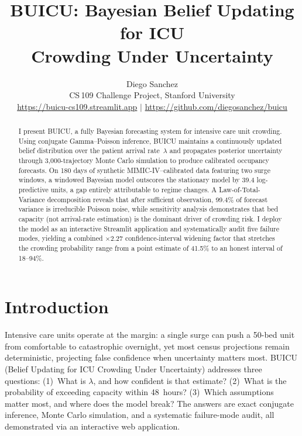 \documentclass[10pt, twocolumn]{article}
\title{\vspace{-1.5em}\textbf{BUICU: Bayesian Belief Updating for ICU\\Crowding Under Uncertainty}\vspace{-0.5em}}
\author{Diego Sanchez\\
\small CS\,109 Challenge Project, Stanford University\\[-2pt]
\small \url{https://buicu-cs109.streamlit.app} \;\;$\mid$\;\;
\url{https://github.com/diegosanchez/buicu}}
\date{}
\begin{document}
\maketitle
\thispagestyle{empty}

\begin{abstract}
\noindent I present BUICU, a fully Bayesian forecasting system for
intensive care unit crowding. Using conjugate Gamma--Poisson inference,
BUICU maintains a continuously updated belief distribution over the
patient arrival rate~$\lambda$ and propagates posterior uncertainty
through 3,000-trajectory Monte Carlo simulation to produce calibrated
occupancy forecasts. On 180 days of synthetic MIMIC-IV--calibrated data
featuring two surge windows, a windowed Bayesian model outscores the
stationary model by 39.4 log-predictive units, a gap entirely
attributable to regime changes. A Law-of-Total-Variance decomposition
reveals that after sufficient observation, 99.4\% of forecast variance
is irreducible Poisson noise, while sensitivity analysis demonstrates
that bed capacity (not arrival-rate estimation) is the dominant driver
of crowding risk. I deploy the model as an interactive Streamlit
application and systematically audit five failure modes, yielding a
combined $\times 2.27$ confidence-interval widening factor that
stretches the crowding probability range from a point estimate of
41.5\% to an honest interval of 18--94\%.
\end{abstract}

\section{Introduction}

Intensive care units operate at the margin: a single surge can push a
50-bed unit from comfortable to catastrophic overnight, yet most census
projections remain deterministic, projecting false confidence when
uncertainty matters most. BUICU (Belief Updating for ICU Crowding Under
Uncertainty) addresses three questions: (1)~What is $\lambda$, and how
confident is that estimate? (2)~What is the probability of exceeding
capacity within 48~hours? (3)~Which assumptions matter most, and where
does the model break? The answers are exact conjugate inference, Monte
Carlo simulation, and a systematic failure-mode audit, all demonstrated
via an interactive web application.
\end{document}

